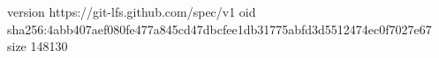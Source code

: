 version https://git-lfs.github.com/spec/v1
oid sha256:4abb407aef080fe477a845cd47dbcfee1db31775abfd3d5512474ec0f7027e67
size 148130

